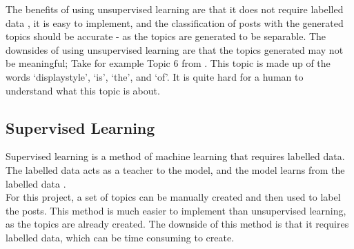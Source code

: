 The benefits of using unsupervised learning are that it does not require labelled data \cite{mahesh2020machine}, it is easy to implement, and the classification
of posts with the generated topics should be accurate - as the topics are generated to be separable. The downsides of using unsupervised
learning are that the topics generated may not be meaningful; Take for example Topic 6 from . This topic is made up
of the words `displaystyle', `is', `the', and `of'. It is quite hard for a human to understand what this topic is about.

\subsection{Supervised Learning}\label{sec:supervised-learning}
Supervised learning is a method of machine learning that requires labelled data. The labelled data acts as a teacher to the model, and
the model learns from the labelled data \cite{mahesh2020machine}.\\
For this project, a set of topics can be manually created and then used to label the posts. This method is much easier to implement
than unsupervised learning, as the topics are already created. The downside of this method is that it requires labelled data, which
can be time consuming to create.\\

